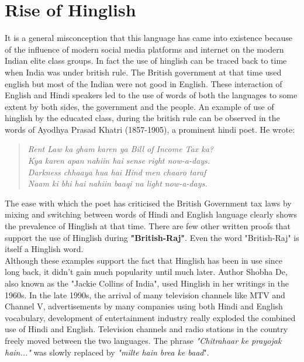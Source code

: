\documentclass{article}
\begin{document}
\section{Rise of Hinglish}
It is a general misconception that this language has came into existence because of the influence of modern social media platforms and internet on the modern Indian elite class groups. In fact the use of hinglish can be traced back to time when India was under british rule. The British government at that time used english but most of the Indian were not good in English. These interaction of English and Hindi speakers led to the use of words of both the languages to some extent by both sides, the government and the people. An example of use of hinglish by the educated class, during the british rule can be observed in the words of Ayodhya Prasad Khatri (1857-1905), a prominent hindi poet. He wrote:
\begin{quote}
    \centering
    \textit{Rent Law ka gham karen ya Bill of Income Tax ka?\\
    Kya karen apan nahiin hai sense right now-a-days.\\
    Darkness chhaaya hua hai Hind men chaaro taraf\\
    Naam ki bhi hai nahiin baaqi na light now-a-days.}
\end{quote} 
The ease with which the poet has criticised the British Government tax laws by mixing and switching between words of Hindi and English language clearly shows the prevalence of Hinglish at that time. There are few other written proofs that support the use of Hinglish during \textbf{"British-Raj"}. Even the word "British-Raj" is itself a Hinglish word. \\
Although these examples support the fact that Hinglish has been in use since long back, it didn't gain much popularity until much later. Author Shobha De, also known as the "Jackie Collins of India", used Hinglish in her writings in the 1960s. In the late 1990s, the arrival of many television channels like MTV and Channel V, advertisements by many companies using both Hindi and English vocabulary, development of entertainment industry really exploded the combined use of Hindi and English. Television channels and radio stations in the country freely moved between the two languages. The phrase \textit{"Chitrahaar ke prayojak hain..."} was slowly replaced by \textit{"milte hain brea ke baad}". \\
\end{document}
